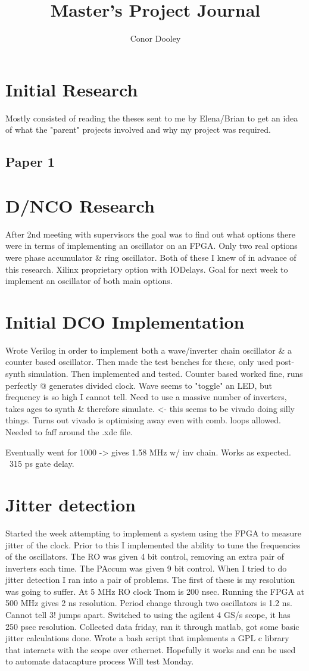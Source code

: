 \documentclass[a4paper,12pt]{report}
\begin{document}
\title{Master's Project Journal}
\author{Conor Dooley}
\maketitle
\section*{Initial Research}
Mostly consisted of reading the theses sent to me by Elena/Brian to get an idea of what the "parent" projects involved and why my project was required.
\subsection*{Paper 1}
\section*{D/NCO Research}
After 2nd meeting with supervisors the goal was to find out what options there were in terms of implementing an oscillator on an FPGA. Only two real options were phase accumulator \& ring oscillator.
Both of these I knew of in advance of this research. Xilinx proprietary option with IODelays. Goal for next week to implement an oscillator of both main options. %
\section*{Initial DCO Implementation}
Wrote Verilog in order to implement both a wave/inverter chain oscillator \& a counter based oscillator. Then made the test benches for these, only used post-synth simulation. Then implemented and tested. Counter based worked fine, runs perfectly @ generates divided clock. Wave seems to "toggle" an LED, but frequency is so high I cannot tell. Need to use a massive number of inverters, takes ages to synth \& therefore simulate. <- this seems to be vivado doing silly things. Turns out vivado is optimising away even with comb. loops allowed. Needed to faff around the .xdc file.

Eventually went for 1000 -> gives 1.58 MHz w/ inv chain. Works as expected. ~315 ps gate delay.
\section*{Jitter detection}
Started the week attempting to implement a system using the FPGA to measure jitter of the clock. Prior to this I implemented the ability to tune the frequencies of the oscillators. The RO was given 4 bit control, removing an extra pair of inverters each time. The PAccum was given 9 bit control.
When I tried to do jitter detection I ran into a pair of problems. The first of these is my resolution was going to suffer.
At 5 MHz RO clock Tnom is 200 nsec. Running the FPGA at 500 MHz gives 2 ns resolution. Period change through two oscillators is 1.2 ns. Cannot tell 3! jumps apart.
Switched to using the agilent 4 GS/s scope, it has 250 psec resolution.
Collected data friday, ran it through matlab, got some basic jitter calculations done.
Wrote a bash script that implements a GPL c library that interacts with the scope over ethernet.
Hopefully it works and can be used to automate datacapture process
Will test Monday.
\end{document}

